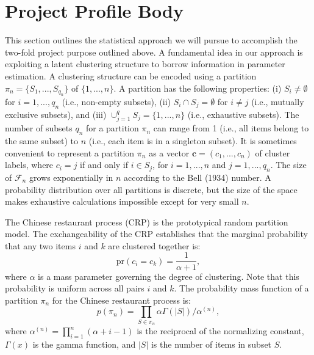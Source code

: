 \documentclass{article}
\begin{document}
\section*{\normalsize Project Profile Body}
  This section outlines the statistical approach we will pursue to accomplish
  the two-fold project purpose outlined above.  A fundamental idea in our
  approach is exploiting a latent clustering structure to borrow information
  in parameter estimation.  A clustering structure can be encoded using
  a partition $\pi_n = \{S_1,...,S_{q_n}\}$ of $\{1,...,n\}$.  A partition has the
  following properties: (i) $S_i \neq \emptyset$ for $i=1,...,q_n$ (i.e.,
  non-empty subsets), (ii) $S_i \cap S_j = \emptyset$ for $i \neq j$ (i.e.,
  mutually exclusive subsets), and (iii) $\cup_{j=1}^q S_j = \{1,...,n\}$
  (i.e., exhaustive subsets).  The number of subsets $q_n$ for a partition
  $\pi_n$ can range from 1 (i.e., all items belong to the same subset) to
  $n$ (i.e., each item is in a singleton subset).
  It is sometimes convenient to represent a partition $\pi_n$ as a vector 
  $\bm{c} = (c_1,...,c_n)$ of cluster labels, where $c_i = j$ if and only if 
  $i \in S_j$, for $i=1,...,n$ and $j=1,...,q_n$.  The size of $\mathcal{F}_n$ 
  grows exponentially in $n$ according to the Bell (1934) number.
  A probability distribution over all partitions is discrete, 
  but the size of the space makes exhaustive calculations impossible 
  except for very small $n$.

  The Chinese restaurant process (CRP) is the prototypical random partition model. 
  The exchangeability of the CRP establishes that the
  marginal probability that any two items $i$ and $k$ are clustered together is:
  \begin{equation*}
  \label{eq_uniform}
  \text{pr}(c_i = c_k ) = \frac{1}{\alpha+1},
  \end{equation*}
  where $\alpha$ is a mass parameter governing the degree of clustering.
  Note that this probability is uniform across all pairs $i$ and $k$.  The probability
  mass function of a partition $\pi_n$ for the Chinese restaurant process
  is:
  \begin{equation*}
  \label{eq_dpm}
  p(\pi_n) = \prod_{S \in \pi_n} \alpha \Gamma(|S|) / \alpha^{(n)},
  \end{equation*}
  where $\alpha^{(n)} = \prod_{i=1}^n(\alpha+i-1)$ is the reciprocal of the
  normalizing constant, $\Gamma(x)$ is the gamma function, and $|S|$ is
  the number of items in subset $S$.
\end{document}
